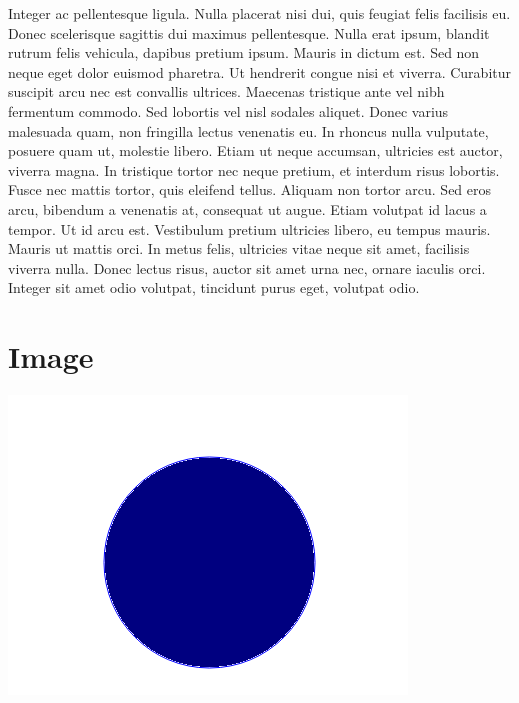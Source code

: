 \documentclass{article}
\begin{document}
\begin{multicols}{5}
		Integer ac pellentesque ligula. Nulla placerat nisi dui, quis feugiat felis facilisis eu. Donec scelerisque sagittis dui maximus pellentesque. Nulla erat ipsum, blandit rutrum felis vehicula, dapibus pretium ipsum. Mauris in dictum est. Sed non neque eget dolor euismod pharetra. Ut hendrerit congue nisi et viverra. Curabitur suscipit arcu nec est convallis ultrices. Maecenas tristique ante vel nibh fermentum commodo.
		Sed lobortis vel nisl sodales aliquet. Donec varius malesuada quam, non fringilla lectus venenatis eu. In rhoncus nulla vulputate, posuere quam ut, molestie libero. Etiam ut neque accumsan, ultricies est auctor, viverra magna. In tristique tortor nec neque pretium, et interdum risus lobortis. Fusce nec mattis tortor, quis eleifend tellus. Aliquam non tortor arcu. Sed eros arcu, bibendum a venenatis at, consequat ut augue. Etiam volutpat id lacus a tempor. Ut id arcu est. Vestibulum pretium ultricies libero, eu tempus mauris. Mauris ut mattis orci. In metus felis, ultricies vitae neque sit amet, facilisis viverra nulla. Donec lectus risus, auctor sit amet urna nec, ornare iaculis orci. Integer sit amet odio volutpat, tincidunt purus eget, volutpat odio.
    \end{multicols}
    \section{Image}
    	\includegraphics[width=\textwidth]{test.png}
    
\end{document}
